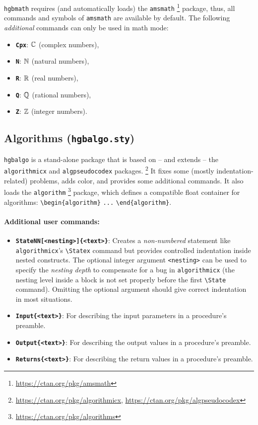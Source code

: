 \documentclass[english]{hgbarticle}
\begin{document}
\texttt{hgbmath} requires (and automatically loads) the \texttt{amsmath}%
\footnote{\url{https://ctan.org/pkg/amsmath}}
package, thus, all commands and symbols of \texttt{amsmath} are available by
default. The following \emph{additional} commands can only be used in math mode:
%
\begin{itemize}
    \item \textbf{\texttt{{\bs}Cpx}}: $\Cpx$ (complex numbers),
    \item \textbf{\texttt{{\bs}N}}: $\N$ (natural numbers),
    \item \textbf{\texttt{{\bs}R}}: $\R$ (real numbers),
    \item \textbf{\texttt{{\bs}Q}}: $\Q$ (rational numbers),
    \item \textbf{\texttt{{\bs}Z}}: $\Z$ (integer numbers).
\end{itemize}


\subsection{Algorithms (\texttt{hgbalgo.sty})}

\texttt{hgbalgo} is a stand-alone package that is based on -- and extends --
the \texttt{algorithmicx} and \texttt{algpseudocodex} packages.%
\footnote{\url{https://ctan.org/pkg/algorithmicx},
    \url{https://ctan.org/pkg/algpseudocodex}}
It fixes some (mostly indentation-related) problems, adds color, and provides
some additional commands. It also loads the \texttt{algorithm}%
\footnote{\url{https://ctan.org/pkg/algorithms}}
package, which defines a compatible float container for algorithms:
\verb!\begin{algorithm}! \verb!...! \verb!\end{algorithm}!.

\paragraph{Additional user commands:}
\begin{itemize}
    \item
    \textbf{\texttt{{\bs}StateNN[<nesting>]\{<text>\}}}:
    Creates a \emph{non-numbered} statement like \texttt{algo\-rith\-micx}'s
    \verb!\Statex! command but provides controlled indentation inside nested
    constructs. The optional integer argument \verb!<nesting>! can be used to
    specify the \emph{nesting depth} to compensate for a bug in
    \texttt{algorithmicx} (the nesting level inside a block is not set
    properly before the first \verb!\State! command). Omitting the optional
    argument should give correct indentation in most situations.
    \item
    \textbf{\texttt{{\bs}Input\{<text>\}}}:
    For describing the input parameters in a procedure's preamble.
    \item
    \textbf{\texttt{{\bs}Output\{<text>\}}}:
    For describing the output values in a procedure's preamble.
    \item
    \textbf{\texttt{{\bs}Returns\{<text>\}}}:
    For describing the return values in a procedure's preamble.
\end{itemize}
\end{document}
